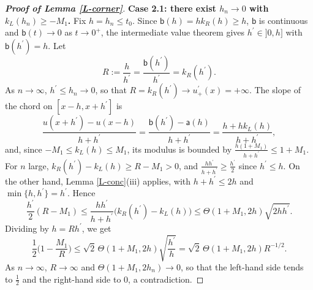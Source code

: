 \documentclass[reqno,12pt]{amsart}
\numberwithin{equation}{section}
\theoremstyle{remark}
\begin{document}
\begin{proof}[\bf Proof of Lemma \ref{L-corner}]
{\bf Case 2.1: there exist \boldmath$h_n\to0$ with $k_L(h_n)\geq-M_1$\unboldmath.} Fix $h=h_n\leq t_0$. Since $\mathsf b(h)=hk_R(h)\geq h$, $\mathsf b$ is continuous and $\mathsf b(t)\to0$ as $t\to0^+$, the intermediate value theorem gives $h^\prime\in]0,h]$ with $\mathsf b(h^\prime)=h$. Let
\begin{equation*}
R:=\frac h{h^\prime}=\frac{\mathsf b(h^\prime)}{h^\prime}=k_R(h^\prime).
\end{equation*}
As $n\to\infty$, $h^\prime\leq h_n\to0$, so that $R=k_R(h^\prime)\to u^\prime_+(x)=+\infty$. The slope of the chord on $[x-h,x+h^\prime]$ is
\begin{equation*}
\frac{u(x+h^\prime)-u(x-h)}{h+h^\prime}=\frac{\mathsf b(h^\prime)-\mathsf a(h)}{h+h^\prime}=\frac{h+hk_L(h)}{h+h^\prime},
\end{equation*}
and, since $-M_1\leq k_L(h)\leq M_1$, its modulus is bounded by $\frac{h(1+M_1)}{h+h^\prime}\leq1+M_1$. For $n$ large, $k_R(h^\prime)-k_L(h)\geq R-M_1>0$, and $\frac{hh^\prime}{h+h^\prime}\geq\frac{h^\prime}2$ since $h^\prime\leq h$. On the other hand, Lemma \ref{L-conc}(iii) applies, with $h+h^\prime\leq2h$ and $\min\{h,h^\prime\}=h^\prime$. Hence
\begin{equation*}
\frac{h^\prime}{2}(R-M_1)\leq\frac{hh^\prime}{h+h^\prime}\big(k_R(h^\prime)-k_L(h)\big)\leq\Theta(1+M_1,2h)\sqrt{2hh^\prime}.
\end{equation*}
Dividing by $h=Rh^\prime$, we get
\begin{equation*}
\frac12\Big(1-\frac{M_1}{R}\Big)\leq\sqrt2\,\Theta(1+M_1,2h)\sqrt{\frac{h^\prime}h}=\sqrt2\,\Theta(1+M_1,2h)R^{-1/2}.
\end{equation*}
As $n\to\infty$, $R\to\infty$ and $\Theta(1+M_1,2h_n)\to0$, so that the left-hand side tends to $\frac12$ and the right-hand side to $0$, a contradiction.

\smallskip


\end{proof}
\end{document}
